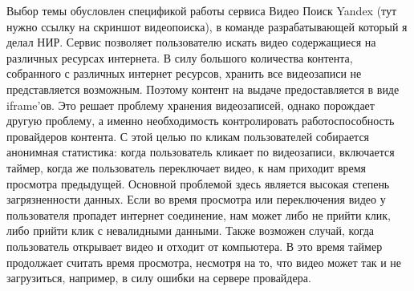 




Выбор темы обусловлен спецификой работы сервиса Видео Поиск Yandex (тут нужно ссылку на скриншот видеопоиска), в команде разрабатывающей который я делал НИР. Сервис позволяет пользователю искать видео содержащиеся на различных ресурсах интернета. В силу большого количества контента, собранного с различных интернет ресурсов, хранить все видеозаписи не представляется возможным. Поэтому контент на выдаче предоставляется в виде iframe'ов. Это решает проблему хранения видеозаписей, однако порождает другую проблему, а именно необходимость контролировать работоспособность провайдеров контента. С этой целью по кликам пользователей собирается анонимная статистика: когда пользователь кликает по видеозаписи, включается таймер, когда же пользователь переключает видео, к нам приходит время просмотра предыдущей. Основной проблемой здесь является высокая степень загрязненности данных. Если во время просмотра или переключения видео у пользователя пропадет интернет соединение, нам может либо не прийти клик, либо прийти клик с невалидными данными. Также возможен случай, когда пользователь открывает видео и отходит от компьютера. В это время таймер продолжает считать время просмотра, несмотря на то, что видео может так и не загрузиться, например, в силу ошибки на сервере провайдера.